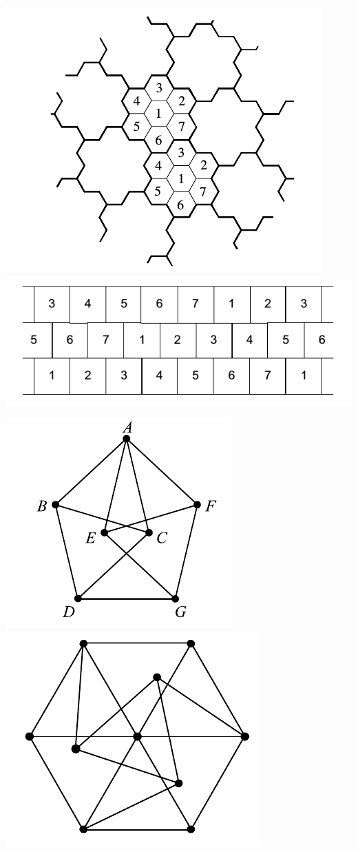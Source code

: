 \documentclass[a4paper]{article}
\begin{document}
\begin{enumerate}
\includegraphics[scale=0.5]{mf5.png}  \includegraphics[scale=0.5]{mf9.png}

\includegraphics[scale=0.4]{mf6.png} \includegraphics[scale=0.4]{mf7.png}


\end{enumerate}
\end{document}
